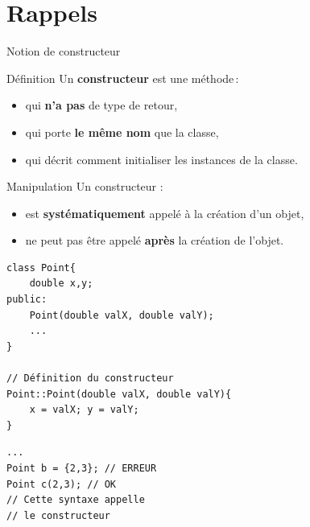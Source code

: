 \section{Rappels}
\begin{frame}[fragile]{Notion de constructeur}

    \begin{block}{Définition}
      Un \textbf{constructeur} est une méthode\,:
      \begin{itemize}
          \item qui \textbf{n'a pas} de type de retour,
          \item qui porte \textbf{le même nom} que la classe,
          \item qui décrit comment initialiser les instances de la classe.
      \end{itemize}
    \end{block}
    \begin{overprint}
    \begin{alertblock}{Manipulation}
      Un constructeur :
      \begin{itemize}
          \item est \textbf{systématiquement} appelé à la création d'un objet,
          \item ne peut pas être appelé \textbf{après} la création de l'objet.
      \end{itemize}
    \end{alertblock}

    \begin{minipage}{\linewidth}
    \begin{minipage}{0.59\linewidth}
            \begin{verbatim}
class Point{
    double x,y;
public:
    Point(double valX, double valY);
    ...
}

// Définition du constructeur
Point::Point(double valX, double valY){
    x = valX; y = valY;
}
            \end{verbatim}
    \end{minipage}
    \hfill
    \begin{minipage}{0.39\linewidth}
            \begin{verbatim}
...
Point b = {2,3}; // ERREUR
Point c(2,3); // OK
// Cette syntaxe appelle
// le constructeur
            \end{verbatim}
        
    \end{minipage}
    \end{minipage}
    \end{overprint}
\end{frame}

